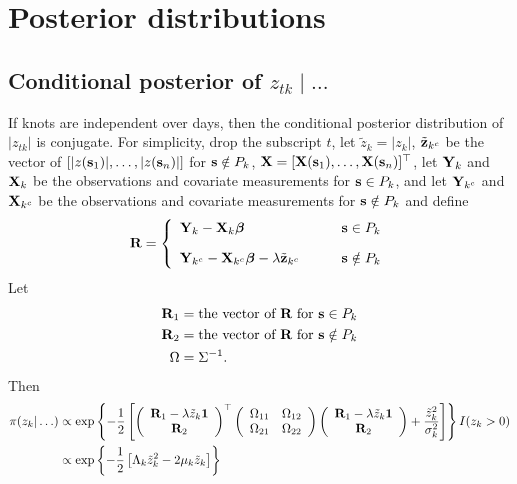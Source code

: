 \documentclass[useAMS,usenatbib,referee]{biomweb}
\begin{document}
\section{Posterior distributions} \label{sta:posterior}

\subsection*{Conditional posterior of $z_{tk} \mid \ldots $}\label{sts:mvcondu}
If knots are independent over days, then the conditional posterior distribution of $|z_{tk}|$ is conjugate.
For simplicity, drop the subscript $t$, let $\tilde{z}_{k} = |z_{k}|$, $\tilde{\mbox{\bf z}}_{k^c}$ be the vector of $[|z(\mbox{\bf s}_1)|, \ldots, |z(\mbox{\bf s}_n)|]$ for $\mbox{\bf s} \notin P_k$, $\mbox{\bf X} = [\mbox{\bf X}(\mbox{\bf s}_1), \ldots, \mbox{\bf X}(\mbox{\bf s}_n)]^\top$, let $\mbox{\bf Y}_k$ and $\mbox{\bf X}_k$ be the observations and covariate measurements for $\mbox{\bf s} \in P_k$, and let $\mbox{\bf Y}_{k^c}$ and $\mbox{\bf X}_{k^c}$ be the observations and covariate measurements for $\mbox{\bf s} \notin P_k$ and define
\begin{align*}
\mbox{\bf R} = \left\{
    \begin{array}{ll}
        \mbox{\bf Y}_k - \mbox{\bf X}_k \mbox{\boldmath $\beta$} & \mbox{\bf s} \in P_k\\[1em]
        \mbox{\bf Y}_{k^c} - \mbox{\bf X}_{k^c} \mbox{\boldmath $\beta$} - \lambda \tilde{\mbox{\bf z}}_{k^c} \qquad & \mbox{\bf s} \notin P_k
    \end{array}
\right.
\end{align*}
Let
\begin{align*}
    \mbox{\bf R}_1 &= \text{the vector of } \mbox{\bf R} \text{ for } \mbox{\bf s} \in P_k \\
    \mbox{\bf R}_2 &= \text{the vector of } \mbox{\bf R} \text{ for } \mbox{\bf s} \notin P_k \\
    \Omega &= \Sigma^{-1}.
\end{align*}
Then
\begin{align*}
    \pi(z_k | \ldots) &\propto \exp \left\{ -\frac{ 1 }{ 2 } \left[
        \left( \begin{array}{c}
            \mbox{\bf R}_1 - \lambda \tilde{z}_k \mbox{\boldmath $1$}\\
            \mbox{\bf R}_2
        \end{array} \right)^\top
        \left( \begin{array}{cc}
            \Omega_{11} & \Omega_{12}\\
            \Omega_{21} & \Omega_{22}
        \end{array} \right)
        \left( \begin{array}{c}
            \mbox{\bf R}_1 - \lambda \tilde{z}_k \mbox{\boldmath $1$}\\
            \mbox{\bf R}_2
        \end{array} \right)
        +  \frac{ {\tilde{z}_k}^2 }{ \sigma_k^2 }\right]
    \right\} I(z_k > 0) \\
        &\propto \exp \left\{ -\frac{ 1 }{ 2 } \left[ \Lambda_k {\tilde{z}_k}^2 - 2 \mu_k \tilde{z}_k \right] \right\}
\end{align*}
\end{document}
